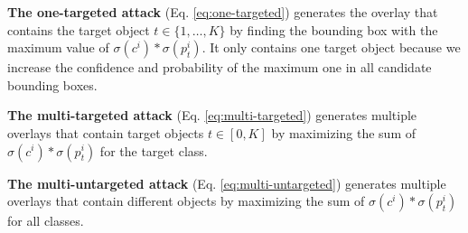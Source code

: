 


\textbf{The one-targeted attack} (Eq. \ref{eq:one-targeted}) generates the overlay that contains the target object $t \in \{1,\dots,K\}$ by finding the bounding box with the maximum value of $\sigma(c^i) * \sigma(p^i_t)$. It only contains one target object because we increase the confidence and probability of the maximum one in all candidate bounding boxes. 

\textbf{The multi-targeted attack} (Eq. \ref{eq:multi-targeted}) generates multiple overlays that contain target objects $t \in [0, K]$ by maximizing the sum of $\sigma(c^i) * \sigma(p^i_t)$ for the target class.

\textbf{The multi-untargeted attack} (Eq. \ref{eq:multi-untargeted}) generates multiple overlays that contain different objects by maximizing the sum of $\sigma(c^i) * \sigma(p^i_t)$ for all classes.

\clearpage

